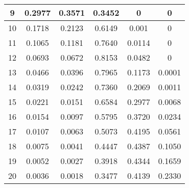 \begin{table}
\begin{tabular}{|l|l|l|l|l|l|}
\hline
\multicolumn{1}{|c|}{9} & \multicolumn{1}{c|}{0.2977} & \multicolumn{1}{c|}{0.3571} & \multicolumn{1}{c|}{0.3452} & \multicolumn{1}{c|}{0} & \multicolumn{1}{c|}{0} \\ 
\hline
\multicolumn{1}{|c|}{10} & \multicolumn{1}{c|}{0.1718} & \multicolumn{1}{c|}{0.2123} & \multicolumn{1}{c|}{0.6149} & \multicolumn{1}{c|}{0.001} & \multicolumn{1}{c|}{0} \\ 
\hline
\multicolumn{1}{|c|}{11} & \multicolumn{1}{c|}{0.1065} & \multicolumn{1}{c|}{0.1181} & \multicolumn{1}{c|}{0.7640} & \multicolumn{1}{c|}{0.0114} & \multicolumn{1}{c|}{0} \\ 
\hline
\multicolumn{1}{|c|}{12} & \multicolumn{1}{c|}{0.0693} & \multicolumn{1}{c|}{0.0672} & \multicolumn{1}{c|}{0.8153} & \multicolumn{1}{c|}{0.0482} & \multicolumn{1}{c|}{0} \\ 
\hline
\multicolumn{1}{|c|}{13} & \multicolumn{1}{c|}{0.0466} & \multicolumn{1}{c|}{0.0396} & \multicolumn{1}{c|}{0.7965} & \multicolumn{1}{c|}{0.1173} & \multicolumn{1}{c|}{0.0001} \\ 
\hline
\multicolumn{1}{|c|}{14} & \multicolumn{1}{c|}{0.0319} & \multicolumn{1}{c|}{0.0242} & \multicolumn{1}{c|}{0.7360} & \multicolumn{1}{c|}{0.2069} & \multicolumn{1}{c|}{0.0011} \\ 
\hline
\multicolumn{1}{|c|}{15} & \multicolumn{1}{c|}{0.0221} & \multicolumn{1}{c|}{0.0151} & \multicolumn{1}{c|}{0.6584} & \multicolumn{1}{c|}{0.2977} & \multicolumn{1}{c|}{0.0068} \\ 
\hline
\multicolumn{1}{|c|}{16} & \multicolumn{1}{c|}{0.0154} & \multicolumn{1}{c|}{0.0097} & \multicolumn{1}{c|}{0.5795} & \multicolumn{1}{c|}{0.3720} & \multicolumn{1}{c|}{0.0234} \\ 
\hline
\multicolumn{1}{|c|}{17} & \multicolumn{1}{c|}{0.0107} & \multicolumn{1}{c|}{0.0063} & \multicolumn{1}{c|}{0.5073} & \multicolumn{1}{c|}{0.4195} & \multicolumn{1}{c|}{0.0561} \\ 
\hline
\multicolumn{1}{|c|}{18} & \multicolumn{1}{c|}{0.0075} & \multicolumn{1}{c|}{0.0041} & \multicolumn{1}{c|}{0.4447} & \multicolumn{1}{c|}{0.4387} & \multicolumn{1}{c|}{0.1050} \\ 
\hline
\multicolumn{1}{|c|}{19} & \multicolumn{1}{c|}{0.0052} & \multicolumn{1}{c|}{0.0027} & \multicolumn{1}{c|}{0.3918} & \multicolumn{1}{c|}{0.4344} & \multicolumn{1}{c|}{0.1659} \\ 
\hline
\multicolumn{1}{|c|}{20} & \multicolumn{1}{c|}{0.0036} & \multicolumn{1}{c|}{0.0018} & \multicolumn{1}{c|}{0.3477} & \multicolumn{1}{c|}{0.4139} & \multicolumn{1}{c|}{0.2330} \\ 

\end{tabular}
\end{table}
